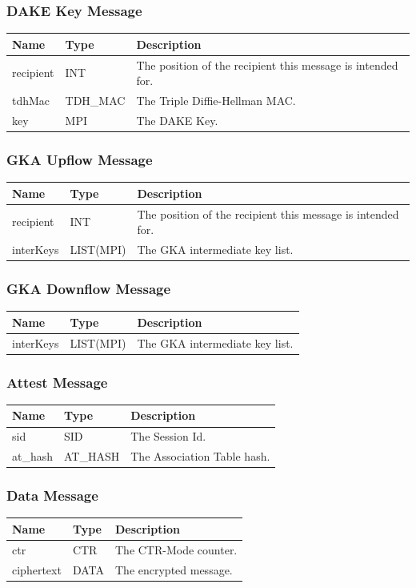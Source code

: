 \documentclass[12pt,titlepage,a4paper]{article}
\begin{document}
\subsubsection{DAKE Key Message}
\begin{tabular}{l l l}
Name        & Type      & Description \\
\hline
recipient   & INT       & The position of the recipient this message is intended for. \\
tdhMac      & TDH\_MAC  & The Triple Diffie-Hellman MAC. \\
key         & MPI       & The DAKE Key. \\
\end{tabular}

\subsubsection{GKA Upflow Message}
\begin{tabular}{l l l}
Name        & Type      & Description \\
\hline
recipient   & INT       & The position of the recipient this message is intended for. \\
interKeys   & LIST(MPI) & The GKA intermediate key list. \\
\end{tabular}

\subsubsection{GKA Downflow Message}
\begin{tabular}{l l l}
Name        & Type      & Description \\
\hline
interKeys   & LIST(MPI) & The GKA intermediate key list. \\
\end{tabular}

\subsubsection{Attest Message}
\begin{tabular}{l l l}
Name        & Type      & Description \\
\hline
sid         & SID       & The Session Id. \\
at\_hash     & AT\_HASH  & The Association Table hash. \\
\end{tabular}

\subsubsection{Data Message}
\begin{tabular}{l l l}
Name        & Type      & Description \\
\hline
ctr         & CTR       & The CTR-Mode counter. \\
ciphertext  & DATA      & The encrypted message. \\
\end{tabular}
\end{document}
